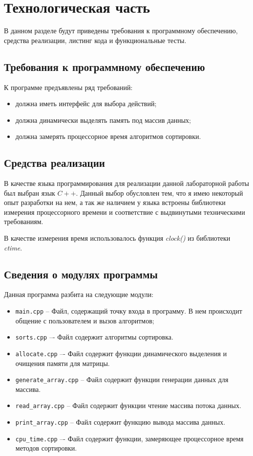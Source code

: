 \chapter{Технологическая часть}

В данном разделе будут приведены требования к программному обеспечению, средства реализации, листинг кода и функциональные тесты.

\section{Требования к программному обеспечению}

К программе предъявлены ряд требований:

\begin{itemize}
	\item должна иметь интерфейс для выбора действий;
	\item должна динамически выделять память под массив данных;
	\item должна замерять процессорное время алгоритмов сортировки.
\end{itemize}

\section{Средства реализации}

В качестве языка программирования для реализации данной лабораторной работы был выбран язык $C++$\cite{cpp-lang}. Данный выбор обусловлен тем,
что я имею некоторый опыт разработки на нем, а так же наличием у языка
встроены библиотеки измерения процессорного времени и соответствие с выдвинутыми техническими требованиям.

В качестве измерения время использовалось функция \textit{clock()} из библиотеки \textit{ctime}\cite{cpp-lang-time}. 

\section{Сведения о модулях программы}

Данная программа разбита на следующие модули:

\begin{itemize}
	\item \texttt{main.cpp} -- Файл, содержащий точку входа в программу. В нем происходит
	общение с пользователем и вызов алгоритмов;
	\item \texttt{sorts.cpp} –- Файл содержит алгоритмы сортировка.
	\item \texttt{allocate.cpp} –- Файл содержит функции динамического выделения и очищения памяти для матрицы.
	\item \texttt{generate\_array.cpp} -- Файл содержит функции генерации данных для массива.
	\item \texttt{read\_array.cpp} -- Файл содержит функции чтение массива потока данных.
	\item \texttt{print\_array.cpp} -- Файл содержит функцию вывода массива данных.
	\item \texttt{cpu\_time.cpp} –- Файл содержит функции, замеряющее процессорное время методов сортировки.
\end{itemize}

